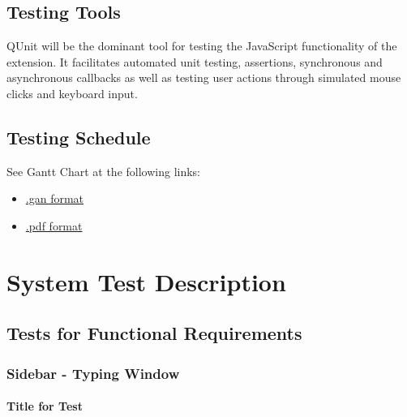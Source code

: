 \documentclass[12pt, titlepage]{article}
\begin{document}
\subsection{Testing Tools}

QUnit will be the dominant tool for testing the JavaScript functionality of the 
extension. It facilitates automated unit testing, assertions, synchronous and 
asynchronous callbacks as well as testing user actions through simulated mouse 
clicks and keyboard input.

\subsection{Testing Schedule}
		
See Gantt Chart at the following links:

\begin{itemize}
	\item 
	\href{https://gitlab.cas.mcmaster.ca/macsidenotes/macsidenotes/blob/master/ProjectSchedule/MacSidenotesProjectSchedule.gan}{.gan
	 format}
	\item 
	\href{https://gitlab.cas.mcmaster.ca/macsidenotes/macsidenotes/blob/master/ProjectSchedule/MacSidenotesProjectSchedule.pdf}{.pdf
	 format}
\end{itemize}


\section{System Test Description}
	
\subsection{Tests for Functional Requirements}

\subsubsection{Sidebar - Typing Window}
		
\paragraph{Title for Test}
\end{document}
